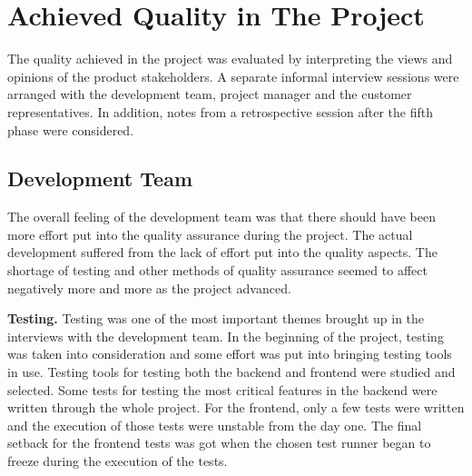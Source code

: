 



 


 \section{Achieved Quality in The Project}
\label{sec:achieved_quality}

 The quality achieved in the project was evaluated by interpreting the views and opinions of the product stakeholders. A separate informal interview sessions were arranged with the development team, project manager and the customer representatives. In addition, notes from a retrospective session after the fifth phase were considered.

\subsection{Development Team}

The overall feeling of the development team was that there should have been more effort put into the quality assurance during the project. The actual development suffered from the lack of effort put into the quality aspects. The shortage of testing and other methods of quality assurance seemed to affect negatively more and more as the project advanced. 

\textbf{Testing.} Testing was one of the most important themes brought up in the interviews with the development team. In the beginning of the project, testing was taken into consideration and some effort was put into bringing testing tools in use. Testing tools for testing both the backend and frontend were studied and selected. Some tests for testing the most critical features in the backend were written through the whole project. For the frontend, only a few tests were written and the execution of those tests were unstable from the day one. The final setback for the frontend tests was got when the chosen test runner began to freeze during the execution of the tests.

